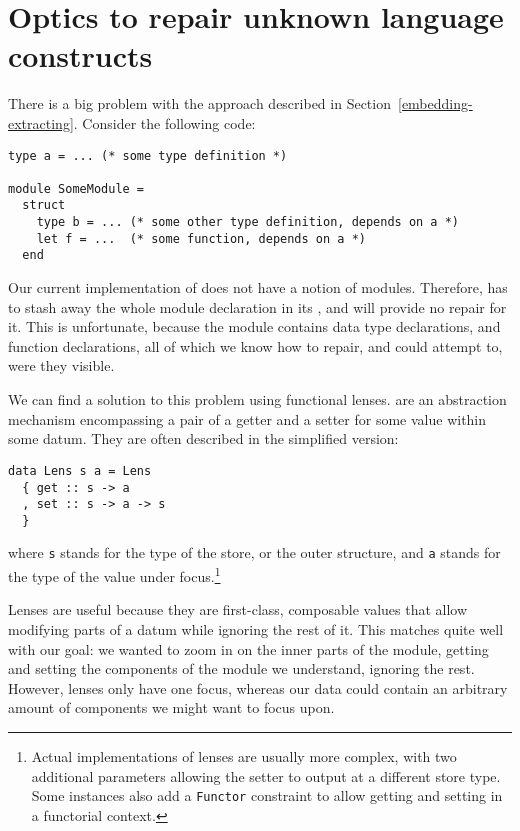 \section{Optics to repair unknown language constructs}\label{coop-optics}

There is a big problem with the approach described in
Section~\ref{embedding-extracting}.  Consider the following \OCaml{} code:

\begin{verbatim}
type a = ... (* some type definition *)

module SomeModule =
  struct
    type b = ... (* some other type definition, depends on a *)
    let f = ...  (* some function, depends on a *)
  end
\end{verbatim}

Our current implementation of \Chick{} does not have a notion of modules.
Therefore, \Coop{} has to stash away the whole module declaration in its
, and will provide no repair for it.  This is
unfortunate, because the module contains data type declarations, and function
declarations, all of which we know how to repair, and could attempt to, were
they visible.

We can find a solution to this problem using functional lenses.  
are an abstraction mechanism encompassing a pair of a getter and a setter for
some value within some datum.  They are often described in the simplified
version:

\begin{verbatim}
data Lens s a = Lens
  { get :: s -> a
  , set :: s -> a -> s
  }
\end{verbatim}

\noindent where \texttt{s} stands for the type of the store, or the
outer structure, and \texttt{a} stands for the type of the value
under focus.\footnote{Actual implementations of lenses are usually more complex,
with two additional parameters allowing the setter to output at a different
store type. Some instances also add a \texttt{Functor} constraint
to allow getting and setting in a functorial context.}

Lenses are useful because they are first-class, composable values that allow
modifying parts of a datum while ignoring the rest of it.  This matches quite
well with our goal: we wanted to zoom in on the inner parts of the module,
getting and setting the components of the module we understand, ignoring the
rest.  However, lenses only have one focus, whereas our data could contain
an arbitrary amount of components we might want to focus upon.

